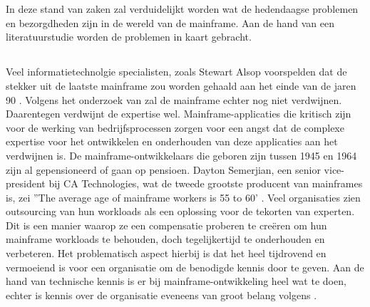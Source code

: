 \chapter{}
\label{ch:stand-van-zaken}



In deze stand van zaken zal verduidelijkt worden wat de hedendaagse problemen en bezorgdheden zijn in de wereld van de mainframe. Aan de hand van een literatuurstudie worden de problemen in kaart gebracht. 

\section{}
\label{sec:Verdwijnen van expertise}

Veel informatietechnolgie specialisten, zoals Stewart Alsop voorspelden dat de stekker uit de laatste mainframe zou worden gehaald aan het einde van de jaren 90 \autocite{McCracken2012}. Volgens het onderzoek van \textcite{Waites2013} zal de mainframe echter nog niet verdwijnen. Daarentegen verdwijnt de expertise wel. Mainframe-applicaties die kritisch zijn voor de werking van bedrijfsprocessen zorgen voor een angst dat de complexe expertise voor het ontwikkelen en onderhouden van deze applicaties aan het verdwijnen is. De mainframe-ontwikkelaars die geboren zijn tussen 1945 en 1964 zijn al gepensioneerd of gaan op pensioen. Dayton Semerjian, een senior vice-president bij CA Technologies, wat de tweede grootste producent van mainframes is, zei ''The average age of mainframe workers is 55 to 60' \autocite{Waites2013}. Veel organisaties zien outsourcing van hun workloads als een oplossing voor de tekorten van experten. Dit is een manier waarop ze een compensatie proberen te creëren om hun mainframe workloads te behouden, doch tegelijkertijd te onderhouden en verbeteren. Het problematisch aspect hierbij is dat het heel tijdrovend en vermoeiend is voor een organisatie om de benodigde kennis door te geven. Aan de hand van technische kennis is er bij mainframe-ontwikkeling heel wat te doen, echter is kennis over de organisatie eveneens van groot belang volgens \textcite{Waites2013}.

